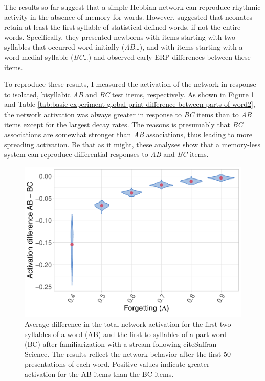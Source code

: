 \documentclass[
]{article}
\begin{document}
The results so far suggest that a simple Hebbian network can reproduce
rhythmic activity in the absence of memory for words. However,
\citep{Flo2022} suggested that neonates retain at least the first
syllable of statistical defined words, if not the entire words.
Specifically, they presented newborns with items starting with two
syllables that occurred word-initially (\emph{AB}\ldots), and with items
starting with a word-medial syllable (\emph{BC}\ldots) and observed
early ERP differences between these items.

To reproduce these results, I measured the activation of the network in
response to isolated, bisyllabic \emph{AB} and \emph{BC} test items,
respectively. As shown in Figure
\ref{fig:basic-experiment-global-print-act-after-2syll-plot} and Table
\ref{tab:basic-experiment-global-print-difference-between-parts-of-word2},
the network activation was always greater in response to \emph{BC} items
than to \emph{AB} items except for the largest decay rates. The reasons
is presumably that \emph{BC} associations are somewhat stronger than
\emph{AB} associations, thus leading to more spreading activation. Be
that as it might, these analyses show that a memory-less system can
reproduce differential responses to \emph{AB} and \emph{BC} items.

\begin{figure}
\includegraphics[width=1\linewidth]{tp_model_entrainment_files/figure-latex/basic-experiment-global-print-act-after-2syll-plot-1} \caption{Average difference in the total network activation for the first two syllables of a word (AB) and the first to syllables of a part-word (BC) after familiarization with a stream following cite{Saffran-Science}. The results reflect the network behavior after the first 50 presentations of each word. Positive values indicate greater activation for the AB items than the BC items.}\label{fig:basic-experiment-global-print-act-after-2syll-plot}
\end{figure}
\end{document}
